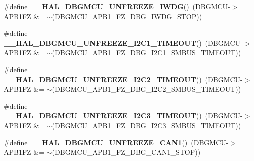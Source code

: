 \begin{DoxyCompactItemize}
\item 
\#define {\bfseries \+\_\+\+\_\+\+H\+A\+L\+\_\+\+D\+B\+G\+M\+C\+U\+\_\+\+U\+N\+F\+R\+E\+E\+Z\+E\+\_\+\+I\+W\+DG}()~(D\+B\+G\+M\+CU-\/$>$A\+P\+B1\+FZ \&= $\sim$(D\+B\+G\+M\+C\+U\+\_\+\+A\+P\+B1\+\_\+\+F\+Z\+\_\+\+D\+B\+G\+\_\+\+I\+W\+D\+G\+\_\+\+S\+T\+OP))\hypertarget{group___h_a_l___exported___macros_gab29a88ef9c31cbe107c58b9ecc3bdf79}{}\label{group___h_a_l___exported___macros_gab29a88ef9c31cbe107c58b9ecc3bdf79}

\item 
\#define {\bfseries \+\_\+\+\_\+\+H\+A\+L\+\_\+\+D\+B\+G\+M\+C\+U\+\_\+\+U\+N\+F\+R\+E\+E\+Z\+E\+\_\+\+I2\+C1\+\_\+\+T\+I\+M\+E\+O\+UT}()~(D\+B\+G\+M\+CU-\/$>$A\+P\+B1\+FZ \&= $\sim$(D\+B\+G\+M\+C\+U\+\_\+\+A\+P\+B1\+\_\+\+F\+Z\+\_\+\+D\+B\+G\+\_\+\+I2\+C1\+\_\+\+S\+M\+B\+U\+S\+\_\+\+T\+I\+M\+E\+O\+UT))\hypertarget{group___h_a_l___exported___macros_ga636083d6b6931b1cf35e7c39aebf0723}{}\label{group___h_a_l___exported___macros_ga636083d6b6931b1cf35e7c39aebf0723}

\item 
\#define {\bfseries \+\_\+\+\_\+\+H\+A\+L\+\_\+\+D\+B\+G\+M\+C\+U\+\_\+\+U\+N\+F\+R\+E\+E\+Z\+E\+\_\+\+I2\+C2\+\_\+\+T\+I\+M\+E\+O\+UT}()~(D\+B\+G\+M\+CU-\/$>$A\+P\+B1\+FZ \&= $\sim$(D\+B\+G\+M\+C\+U\+\_\+\+A\+P\+B1\+\_\+\+F\+Z\+\_\+\+D\+B\+G\+\_\+\+I2\+C2\+\_\+\+S\+M\+B\+U\+S\+\_\+\+T\+I\+M\+E\+O\+UT))\hypertarget{group___h_a_l___exported___macros_ga0308bdec86c19b7bbe236c4724d7d536}{}\label{group___h_a_l___exported___macros_ga0308bdec86c19b7bbe236c4724d7d536}

\item 
\#define {\bfseries \+\_\+\+\_\+\+H\+A\+L\+\_\+\+D\+B\+G\+M\+C\+U\+\_\+\+U\+N\+F\+R\+E\+E\+Z\+E\+\_\+\+I2\+C3\+\_\+\+T\+I\+M\+E\+O\+UT}()~(D\+B\+G\+M\+CU-\/$>$A\+P\+B1\+FZ \&= $\sim$(D\+B\+G\+M\+C\+U\+\_\+\+A\+P\+B1\+\_\+\+F\+Z\+\_\+\+D\+B\+G\+\_\+\+I2\+C3\+\_\+\+S\+M\+B\+U\+S\+\_\+\+T\+I\+M\+E\+O\+UT))\hypertarget{group___h_a_l___exported___macros_ga8beda05b7dc4962557f98a06e29326a4}{}\label{group___h_a_l___exported___macros_ga8beda05b7dc4962557f98a06e29326a4}

\item 
\#define {\bfseries \+\_\+\+\_\+\+H\+A\+L\+\_\+\+D\+B\+G\+M\+C\+U\+\_\+\+U\+N\+F\+R\+E\+E\+Z\+E\+\_\+\+C\+A\+N1}()~(D\+B\+G\+M\+CU-\/$>$A\+P\+B1\+FZ \&= $\sim$(D\+B\+G\+M\+C\+U\+\_\+\+A\+P\+B1\+\_\+\+F\+Z\+\_\+\+D\+B\+G\+\_\+\+C\+A\+N1\+\_\+\+S\+T\+OP))\hypertarget{group___h_a_l___exported___macros_gad580d0ec1c7b8eb8d5935e1fcbd58b07}{}\label{group___h_a_l___exported___macros_gad580d0ec1c7b8eb8d5935e1fcbd58b07}


\end{DoxyCompactItemize}
